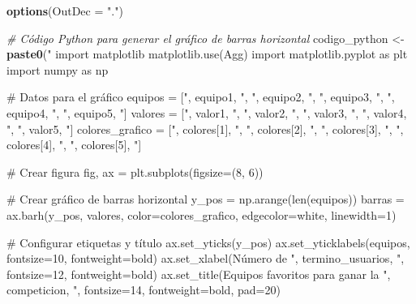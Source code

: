 \documentclass[
]{article}
\newenvironment{Shaded}{\begin{snugshade}}{\end{snugshade}}
\newcommand{\AttributeTok}[1]{\textcolor[rgb]{0.13,0.29,0.53}{#1}}
\newcommand{\CommentTok}[1]{\textcolor[rgb]{0.56,0.35,0.01}{\textit{#1}}}
\newcommand{\DecValTok}[1]{\textcolor[rgb]{0.00,0.00,0.81}{#1}}
\newcommand{\FunctionTok}[1]{\textcolor[rgb]{0.13,0.29,0.53}{\textbf{#1}}}
\newcommand{\NormalTok}[1]{#1}
\newcommand{\OtherTok}[1]{\textcolor[rgb]{0.56,0.35,0.01}{#1}}
\newcommand{\StringTok}[1]{\textcolor[rgb]{0.31,0.60,0.02}{#1}}
\begin{document}
\begin{Shaded}
\begin{Highlighting}[]
\FunctionTok{options}\NormalTok{(}\AttributeTok{OutDec =} \StringTok{"."}\NormalTok{)}

\CommentTok{\# Código Python para generar el gráfico de barras horizontal}
\NormalTok{codigo\_python }\OtherTok{\textless{}{-}} \FunctionTok{paste0}\NormalTok{(}\StringTok{"}
\StringTok{import matplotlib}
\StringTok{matplotlib.use(\textquotesingle{}Agg\textquotesingle{})}
\StringTok{import matplotlib.pyplot as plt}
\StringTok{import numpy as np}

\StringTok{\# Datos para el gráfico}
\StringTok{equipos = [\textquotesingle{}"}\NormalTok{, equipo1, }\StringTok{"\textquotesingle{}, \textquotesingle{}"}\NormalTok{, equipo2, }\StringTok{"\textquotesingle{}, \textquotesingle{}"}\NormalTok{, equipo3, }\StringTok{"\textquotesingle{}, \textquotesingle{}"}\NormalTok{, equipo4, }\StringTok{"\textquotesingle{}, \textquotesingle{}"}\NormalTok{, equipo5, }\StringTok{"\textquotesingle{}]}
\StringTok{valores = ["}\NormalTok{, valor1, }\StringTok{", "}\NormalTok{, valor2, }\StringTok{", "}\NormalTok{, valor3, }\StringTok{", "}\NormalTok{, valor4, }\StringTok{", "}\NormalTok{, valor5, }\StringTok{"]}
\StringTok{colores\_grafico = [\textquotesingle{}"}\NormalTok{, colores[}\DecValTok{1}\NormalTok{], }\StringTok{"\textquotesingle{}, \textquotesingle{}"}\NormalTok{, colores[}\DecValTok{2}\NormalTok{], }\StringTok{"\textquotesingle{}, \textquotesingle{}"}\NormalTok{, colores[}\DecValTok{3}\NormalTok{], }\StringTok{"\textquotesingle{}, \textquotesingle{}"}\NormalTok{, colores[}\DecValTok{4}\NormalTok{], }\StringTok{"\textquotesingle{}, \textquotesingle{}"}\NormalTok{, colores[}\DecValTok{5}\NormalTok{], }\StringTok{"\textquotesingle{}]}

\StringTok{\# Crear figura}
\StringTok{fig, ax = plt.subplots(figsize=(8, 6))}

\StringTok{\# Crear gráfico de barras horizontal}
\StringTok{y\_pos = np.arange(len(equipos))}
\StringTok{barras = ax.barh(y\_pos, valores, color=colores\_grafico, edgecolor=\textquotesingle{}white\textquotesingle{}, linewidth=1)}

\StringTok{\# Configurar etiquetas y título}
\StringTok{ax.set\_yticks(y\_pos)}
\StringTok{ax.set\_yticklabels(equipos, fontsize=10, fontweight=\textquotesingle{}bold\textquotesingle{})}
\StringTok{ax.set\_xlabel(\textquotesingle{}Número de "}\NormalTok{, termino\_usuarios, }\StringTok{"\textquotesingle{}, fontsize=12, fontweight=\textquotesingle{}bold\textquotesingle{})}
\StringTok{ax.set\_title(\textquotesingle{}Equipos favoritos para ganar la "}\NormalTok{, competicion, }\StringTok{"\textquotesingle{}, fontsize=14, fontweight=\textquotesingle{}bold\textquotesingle{}, pad=20)}


\end{Highlighting}
\end{Shaded}
\end{document}
